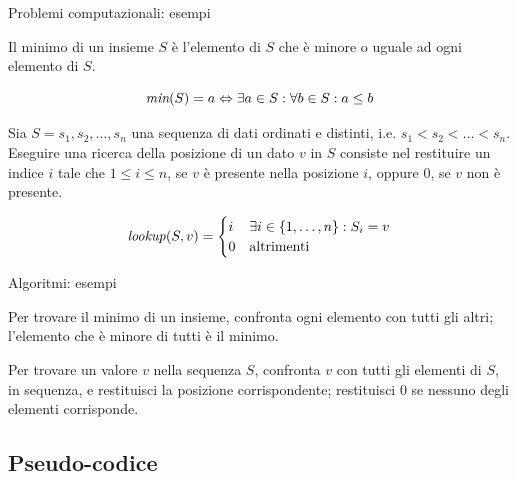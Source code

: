 \begin{frame}{Problemi computazionali: esempi}

\vspace{-9pt}
\begin{myboxtitle}
Il minimo di un insieme $S$ è l'elemento di $S$ che è minore o uguale ad ogni elemento di $S$.

\[
  \textit{min}(S) = a \Leftrightarrow \exists a \in S: \forall b \in S : a \leq b
\]
\end{myboxtitle}

\begin{myboxtitle}
Sia $S=s_1, s_2, \ldots, s_n$ una sequenza di dati ordinati e distinti, i.e.  $s_1 < s_2 < \ldots < s_n$. 
Eseguire una ricerca della posizione di un dato $v$ in $S$ consiste nel restituire un indice $i$ tale che 
$1 \leq i \leq n$, se $v$ è presente nella posizione $i$, oppure $0$, se $v$ non è presente.

\[
 \mathit{lookup}(S, v) = \begin{cases}
  i & \exists i \in \{1, \ldots, n\}: S_i = v \\
  0 & \textrm{altrimenti}
  \end{cases}
\]
\end{myboxtitle}

\end{frame}

\begin{frame}{Algoritmi: esempi}

\vspace{-9pt}
\begin{myboxtitle}
Per trovare il minimo di un insieme, confronta ogni elemento con tutti gli
altri; l’elemento che è minore di tutti è il minimo.
\end{myboxtitle}


\begin{myboxtitle}
Per trovare un valore $v$ nella sequenza $S$, confronta $v$ con tutti gli elementi di $S$, 
in sequenza, e restituisci la posizione corrispondente; restituisci $0$ 
se nessuno degli elementi corrisponde.
\end{myboxtitle}

\end{frame}

\subsection{Pseudo-codice}

